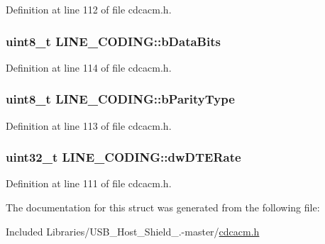 \-Definition at line 112 of file cdcacm.\-h.

\hypertarget{struct_l_i_n_e___c_o_d_i_n_g_a2c360b6f874f2cf45f95492f9e6c1812}{
\subsubsection[{b\-Data\-Bits}]{\setlength{\rightskip}{0pt plus 5cm}uint8\-\_\-t {\bf \-L\-I\-N\-E\-\_\-\-C\-O\-D\-I\-N\-G\-::b\-Data\-Bits}}}\label{struct_l_i_n_e___c_o_d_i_n_g_a2c360b6f874f2cf45f95492f9e6c1812}


\-Definition at line 114 of file cdcacm.\-h.

\hypertarget{struct_l_i_n_e___c_o_d_i_n_g_ad14985344c9e31a210999dfa0b4ccc42}{
\subsubsection[{b\-Parity\-Type}]{\setlength{\rightskip}{0pt plus 5cm}uint8\-\_\-t {\bf \-L\-I\-N\-E\-\_\-\-C\-O\-D\-I\-N\-G\-::b\-Parity\-Type}}}\label{struct_l_i_n_e___c_o_d_i_n_g_ad14985344c9e31a210999dfa0b4ccc42}


\-Definition at line 113 of file cdcacm.\-h.

\hypertarget{struct_l_i_n_e___c_o_d_i_n_g_ae9fd7d7247b4c50df89a6dd5ed955073}{
\subsubsection[{dw\-D\-T\-E\-Rate}]{\setlength{\rightskip}{0pt plus 5cm}uint32\-\_\-t {\bf \-L\-I\-N\-E\-\_\-\-C\-O\-D\-I\-N\-G\-::dw\-D\-T\-E\-Rate}}}\label{struct_l_i_n_e___c_o_d_i_n_g_ae9fd7d7247b4c50df89a6dd5ed955073}


\-Definition at line 111 of file cdcacm.\-h.



\-The documentation for this struct was generated from the following file\-:\begin{DoxyCompactItemize}
\item 
\-Included Libraries/\-U\-S\-B\-\_\-\-Host\-\_\-\-Shield\-\_.-\/master/\hyperlink{cdcacm_8h}{cdcacm.\-h}\end{DoxyCompactItemize}
